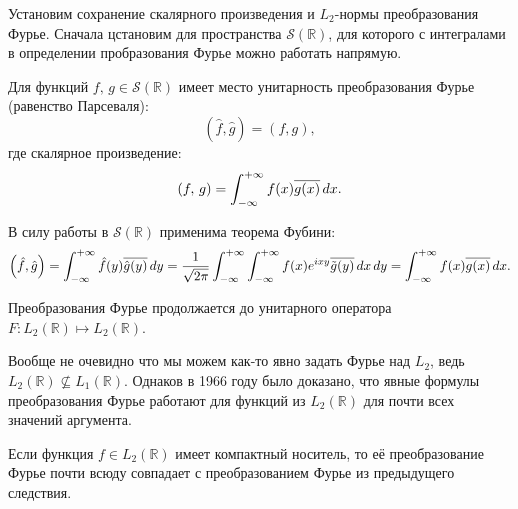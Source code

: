 




Установим сохранение скалярного произведения и $L_2$-нормы преобразования Фурье. Сначала цстановим для пространства $\mathcal S (\mathbb{R})$, для которого с интегралами в определении пробразования Фурье можно работать напрямую.

\begin{to_thr}[]
    Для функций $f,\, g \in \mathcal S (\mathbb{R})$ имеет место унитарность преобразования Фурье (равенство Парсеваля):
    \begin{equation*}
        \left(\hat{f}, \hat{g}\right) = (f, g),
    \end{equation*}
    где скалярное произведение:
    \begin{equation*}
        (f,\, g) = \int_{-\infty}^{+\infty}  f(x) \overline{g(x)} \, d x.
    \end{equation*}
\end{to_thr}

\begin{uproof}
В силу работы в $\mathcal S (\mathbb{R})$ применима теорема Фубини:
\begin{equation*}
    \left(\hat{f}, \hat{g}\right) = \int_{-\infty}^{+\infty}    
    \hat{f} (y)
    \overline{\hat{g}(y)} \, d y = 
    \frac{1}{\sqrt{2\pi}} \int_{-\infty}^{+\infty}  \int_{-\infty}^{+\infty} 
    f(x) e^{ixy} \overline{\tilde{g}(y)} \, d x \, d y = 
    \int_{-\infty}^{+\infty} f(x) \overline{g(x)} \, d x.
\end{equation*}
\end{uproof}

\begin{to_con}
    Преобразования Фурье продолжается до унитарного оператора $F \colon  L_2(\mathbb{R}) \mapsto L_2(\mathbb{R})$.
\end{to_con}


Вообще не очевидно что мы можем как-то явно задать Фурье над $L_2$, ведь $L_2 (\mathbb{R}) \not \subseteq L_1\left(\mathbb{R}\right)$. Однаков в 1966 году было доказано, что явные формулы преобразования Фурье работают для функций из $L_2 (\mathbb{R})$ для почти всех значений аргумента. 

\begin{to_lem}
    Если функция $f \in L_2 (\mathbb{R})$ имеет компактный носитель, то её преобразование Фурье почти всюду совпадает с преобразованием Фурье из предыдущего следствия. 
\end{to_lem}



